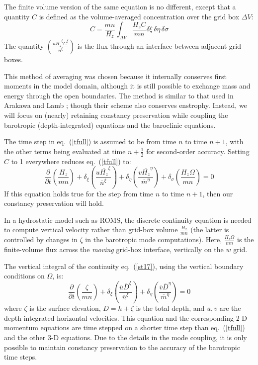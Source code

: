 The finite volume version of the same equation is no different,
except that a quantity $C$ is defined as the volume-averaged
concentration over the grid box $\Delta V$:
\begin{equation}
   C = \frac{mn}{H_z} \int_{\Delta V} \frac{H_z C}{mn} \delta \xi
   \, \delta \eta \, \delta \sigma
\end{equation}
The quantity  $\left(
\frac{u \overline{H_z}^\xi \overline{C}^\xi}{\overline{n}^\xi} \right)$
is the flux through an interface between adjacent grid boxes.

This method of averaging was chosen because it internally conserves
first moments in the model domain, although it is still possible to
exchange mass and energy through the open boundaries. The method is
similar to that used in Arakawa and Lamb \cite{AL}; though their
scheme also conserves enstrophy. Instead, we will focus on (nearly) retaining
constancy preservation while coupling the barotropic
(depth-integrated) equations and the baroclinic equations.

The time step in eq.~(\ref{tfull}) is assumed to be from time $n$ to
time $n+1$, with the other terms being evaluated at time
$n+\frac{1}{2}$ for second-order accuracy.
Setting $C$ to 1 everywhere reduces eq.~(\ref{tfull}) to:
\begin{equation}
   \frac{\partial}{\partial t} \left( \frac{H_z}{m n} \right)
   + \delta_{\xi} \left(
   \frac{u \overline{H_z}^\xi }{\overline{n}^\xi} \right)
   + \delta_{\eta} \left(
   \frac{v \overline{H_z}^\eta}{\overline{m}^\eta} \right)
   + \delta_\sigma \left( 
   \frac{H_z \Omega}{m n} \right) = 0
\label{contfull}
\end{equation}
If this equation holds true for the step from time $n$ to time $n+1$, then
our constancy preservation will hold.

In a hydrostatic model such as ROMS, the discrete continuity
equation is needed to compute vertical velocity rather than grid-box
volume $\frac{H_z}{m n}$ (the latter is controlled by changes in
$\zeta$ in the barotropic mode computations). Here, $\frac{H_z
\Omega}{m n}$ is the finite-volume flux across the {\em moving}
grid-box interface, vertically on the $w$ grid.

The vertical integral of the continuity eq.~(\ref{st17}), using
the vertical boundary conditions on $\Omega$, is:
\begin{equation}
   \frac{\partial}{\partial t} \left( \frac{\zeta}{mn} \right) +
   \delta_{\xi} \left(
   \frac{\overline{u} \overline{D}^\xi }{\overline{n}^\xi} \right)
   + \delta_{\eta} \left(
   \frac{\overline{v} \overline{D}^\eta}{\overline{m}^\eta} \right)
   = 0
\label{zeta1}
\end{equation}
where $\zeta$ is the surface elevation, $D= h+\zeta$ is the total
depth, and $\overline{u},\overline{v}$ are the depth-integrated
horizontal velocities. This equation and the corresponding 2-D
momentum equations are time stepped on a shorter time step than 
eq.~(\ref{tfull}) and the other 3-D equations. Due to the details in
the mode coupling, it is only possible to maintain constancy
preservation to the accuracy of the barotropic time steps.

